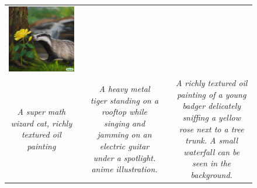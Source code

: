 \begin{figure}[ht!]
\begin{adjustwidth}{-0.8in}{-0.5in}
\begin{tabular}{cccccccccccccccccccc}
\multicolumn{6}{c}{\includegraphics[width=\thirdcolwidth\textwidth]{figures/cherries/badger_rose.jpg}} \\
\multicolumn{6}{C{\thirdcolwidth\textwidth}}{\textit{\tiny A super math wizard cat, richly textured oil painting}} && 
\multicolumn{6}{p{\thirdcolwidth\textwidth}}{\textit{\tiny A heavy metal tiger standing on a rooftop while singing and jamming on an electric guitar under a spotlight. anime illustration.}} && 
\multicolumn{6}{p{\thirdcolwidth\textwidth}}{\textit{\tiny A richly textured oil painting of a young badger delicately sniffing a yellow rose next to a tree trunk. A small waterfall can be seen in the background.}} \\


\end{tabular}
\end{adjustwidth}
\end{figure}
